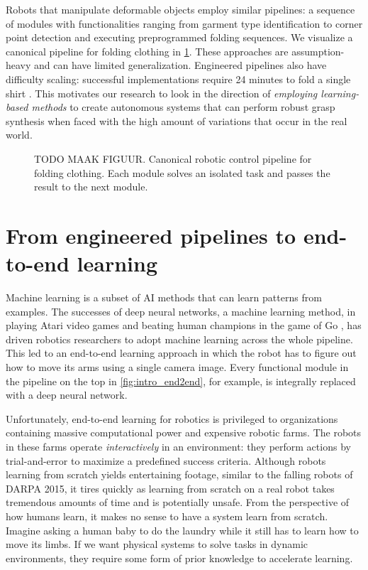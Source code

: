 \documentclass[\home/main.tex]{subfiles}
\begin{document}
Robots that manipulate deformable objects employ similar pipelines: a sequence of modules with functionalities ranging from garment type identification to corner point detection and executing preprogrammed folding sequences. We visualize a canonical pipeline for folding clothing in \cref{fig:intro_canonical_control_pipeline}. These approaches are assumption-heavy and can have limited generalization. Engineered pipelines also have difficulty scaling: successful implementations require 24 minutes to fold a single shirt \autocite{Maitin2010}. This motivates our research to look in the direction of \emph{employing learning-based methods} to create autonomous systems that can perform robust grasp synthesis when faced with the high amount of variations that occur in the real world.

\begin{figure}
    \centering
    
    \caption{TODO MAAK FIGUUR. Canonical robotic control pipeline for folding clothing. Each module solves an isolated task and passes the result to the next module.}
    \label{fig:intro_canonical_control_pipeline}
\end{figure}

\section{From engineered pipelines to end-to-end learning}
Machine learning is a subset of \gls{AI} methods that can learn patterns from examples. The successes of deep neural networks, a machine learning method, in playing Atari video games \autocite{Mnih2015} and beating human champions in the game of Go \autocite{gaemofGo2016}, has driven robotics researchers to adopt machine learning across the whole pipeline. This led to an end-to-end learning approach in which the robot has to figure out how to move its arms using a single camera image. Every functional module in the pipeline on the top in \cref{fig:intro_end2end}, for example, is integrally replaced with a deep neural network.

Unfortunately, end-to-end learning for robotics is privileged to organizations containing massive computational power and expensive robotic farms. The robots in these farms operate \emph{interactively} in an environment: they perform actions by trial-and-error to maximize a predefined success criteria. Although robots learning from scratch yields entertaining footage, similar to the falling robots of DARPA 2015, it tires quickly as learning from scratch on a real robot takes tremendous amounts of time and is potentially unsafe. From the perspective of how humans learn, it makes no sense to have a system learn from scratch. Imagine asking a human baby to do the laundry while it still has to learn how to move its limbs. If we want physical systems to solve tasks in dynamic environments, they require some form of prior knowledge to accelerate learning.
\end{document}
